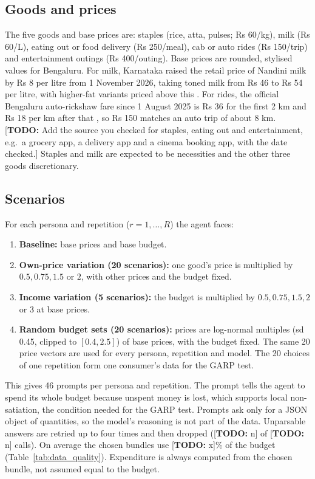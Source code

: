 \documentclass[11pt,a4paper]{article}
\newcommand{\todo}[1]{\textcolor{red!70!black}{[\textbf{TODO:} #1]}}
\newcommand{\NCalls}{\todo{n}}\newcommand{\NFailed}{\todo{n}}\newcommand{\NModels}{\todo{n}}\newcommand{\NConsumers}{\todo{n}}
\newcommand{\MeanBudgetUse}{\todo{x}}\newcommand{\StaplesElast}{\todo{x}}\newcommand{\EatingOutElast}{\todo{x}}
\begin{document}
\subsection{Goods and prices}
The five goods and base prices are: staples (rice, atta, pulses; Rs 60/kg), milk (Rs 60/L), eating out or food delivery (Rs 250/meal), cab or auto rides (Rs 150/trip) and entertainment outings (Rs 400/outing). Base prices are rounded, stylised values for Bengaluru. For milk, Karnataka raised the retail price of Nandini milk by Rs 8 per litre from 1 November 2026, taking toned milk from Rs 46 to Rs 54 per litre, with higher-fat variants priced above this \citep{nandini2026}. For rides, the official Bengaluru auto-rickshaw fare since 1 August 2025 is Rs 36 for the first 2 km and Rs 18 per km after that \citep{autofare2025}, so Rs 150 matches an auto trip of about 8 km. \todo{Add the source you checked for staples, eating out and entertainment, e.g.\ a grocery app, a delivery app and a cinema booking app, with the date checked.} Staples and milk are expected to be necessities and the other three goods discretionary.

\subsection{Scenarios}
For each persona and repetition ($r=1,\dots,R$) the agent faces:
\begin{enumerate}\setlength\itemsep{0pt}
\item \textbf{Baseline:} base prices and base budget.
\item \textbf{Own-price variation (20 scenarios):} one good's price is multiplied by $0.5,0.75,1.5$ or $2$, with other prices and the budget fixed.
\item \textbf{Income variation (5 scenarios):} the budget is multiplied by $0.5,0.75,1.5,2$ or $3$ at base prices.
\item \textbf{Random budget sets (20 scenarios):} prices are log-normal multiples (sd 0.45, clipped to $[0.4,2.5]$) of base prices, with the budget fixed. The same 20 price vectors are used for every persona, repetition and model. The 20 choices of one repetition form one consumer's data for the GARP test.
\end{enumerate}
This gives 46 prompts per persona and repetition. The prompt tells the agent to spend its whole budget because unspent money is lost, which supports local non-satiation, the condition needed for the GARP test. Prompts ask only for a JSON object of quantities, so the model's reasoning is not part of the data. Unparsable answers are retried up to four times and then dropped (\NFailed{} of \NCalls{} calls). On average the chosen bundles use \MeanBudgetUse\% of the budget (Table~\ref{tab:data_quality}). Expenditure is always computed from the chosen bundle, not assumed equal to the budget.
\end{document}
